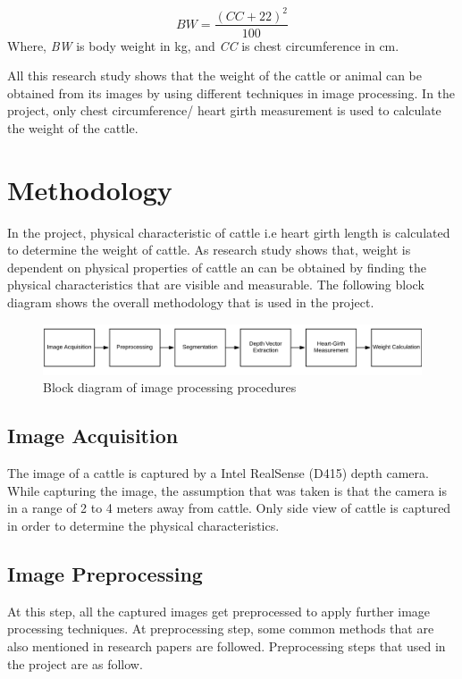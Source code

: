 \documentclass{article}
\begin{document}
\begin{equation}
    BW = \frac{ (CC + 22)^{2}}{100}
\end{equation}
Where, \textit{BW }is body weight in kg, and \textit{CC} is chest circumference in cm.


All this research study shows that the weight of the cattle or animal can be obtained from its images by using different techniques in image processing. In the project, only chest circumference/ heart girth measurement is used to calculate the weight of the cattle. 

\section{Methodology}
\label{sec:pagestyle}

In the project, physical characteristic of cattle i.e heart girth length is calculated to determine the weight of cattle. As research study shows that, weight is dependent on physical properties of cattle an can be obtained by finding the physical characteristics that are visible and measurable. 
The following block diagram shows the overall methodology that is used in the project. 
\begin{figure}[h]
    \centering
    \includegraphics [scale=0.3] {blk}
    \caption{Block diagram of image processing procedures }
    \end{figure}

\subsection{Image Acquisition}

The image of a cattle is captured by a Intel RealSense (D415) depth camera. While capturing the image, the assumption that was taken is that the camera is in a range of 2 to 4 meters away from cattle. Only side view of cattle is captured in order to determine the physical characteristics. 

\subsection{Image Preprocessing}

At this step, all the captured images get preprocessed to apply further image processing techniques. At preprocessing step, some common methods that are also mentioned in research papers are followed. Preprocessing steps that used in the project are as follow.
\end{document}
